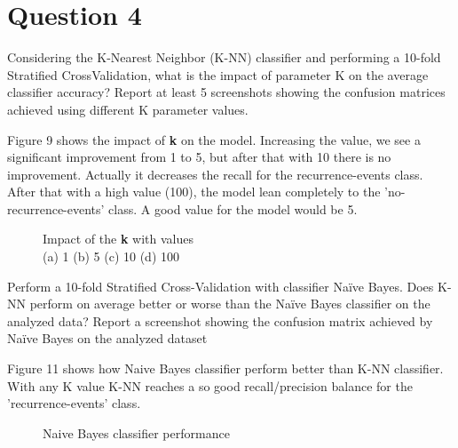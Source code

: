 \section{Question 4}

\begin{question}
    Considering the K-Nearest Neighbor (K-NN) classifier and performing a 10-fold Stratified
    CrossValidation, what is the impact of parameter K on the average classifier accuracy? Report at
    least 5 screenshots showing the confusion matrices achieved using different K parameter values.
\end{question}

\begin{answer}
    Figure 9 shows the impact of \textbf{k} on the model. Increasing the value, we see a significant
    improvement from 1 to 5, but after that with 10 there is no improvement. Actually it decreases
    the recall for the recurrence-events class. After that with a high value (100), the model lean
    completely to the 'no-recurrence-events' class. A good value for the model would be 5.

    \begin{figure}
        \centering
        \caption{Impact of the \textbf{k} with values
            \\
            (a) 1 (b) 5 (c) 10 (d) 100}
    \end{figure}
\end{answer}

\begin{question}
    Perform a 10-fold Stratified Cross-Validation with classifier Naïve Bayes. Does K-NN perform on
    average better or worse than the Naïve Bayes classifier on the analyzed data? Report a screenshot
    showing the confusion matrix achieved by Naïve Bayes on the analyzed dataset
\end{question}

\begin{answer}
    Figure 11 shows how Naive Bayes classifier perform better than K-NN classifier. With any K value
    K-NN reaches a so good recall/precision balance for the 'recurrence-events' class.
    \begin{figure}
        \centering
        \caption{Naive Bayes classifier performance}
    \end{figure}
\end{answer}
